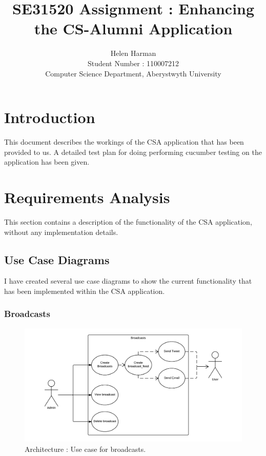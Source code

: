 \documentclass[10pt,a4paper,titlepage]{article}
\author{Helen Harman \\ Student Number : 110007212 \\ Computer Science Department, Aberystwyth University}
\title{SE31520 Assignment : Enhancing the CS-Alumni Application}
\begin{document}
\maketitle 

\tableofcontents

\pagebreak 
\section{Introduction}
This document describes the workings of the CSA application that has been provided to us. A detailed test plan for doing performing cucumber testing on the application has been given.
\section{Requirements Analysis}
This section contains a description of the functionality of the CSA application, without any implementation details. 
\subsection{Use Case Diagrams}
I have created several use case diagrams to show the current functionality that has been implemented within the CSA application. 
\subsubsection{Broadcasts}
\begin{figure}[H]
\begin{center}
\includegraphics[scale=0.3]{include/broadcasts_Use_Case.png}  
\caption{Architecture : Use case for broadcasts. }
\label{fig:broadcastUseCase}
\end{center}
\end{figure}
\end{document}
